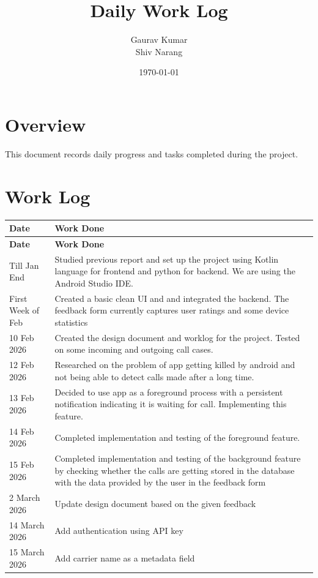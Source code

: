 \documentclass[11pt,a4paper]{article}
\title{\textbf{Daily Work Log}}
\author{Gaurav Kumar \\
Shiv Narang}
\date{\today}
\begin{document}
\maketitle

\section*{Overview}
This document records daily progress and tasks completed during the project.

\vspace{0.5cm}

\section*{Work Log}

\begin{longtable}{|p{3cm}|p{12cm}|}
\hline
\textbf{Date} & \textbf{Work Done} \\
\hline
\endfirsthead

\hline
\textbf{Date} & \textbf{Work Done} \\
\hline
\endhead


Till Jan End &
Studied previous report and set up the project using Kotlin language for frontend and python for backend. We are using the Android Studio IDE. \\
\hline

First Week of Feb &
Created a basic clean UI and and integrated the backend. The feedback form currently captures user ratings and some device statistics \\
\hline

10 Feb 2026 &
Created the design document and worklog for the project. Tested on some incoming and outgoing call cases.  \\
\hline

12 Feb 2026 &
Researched on the problem of app getting killed by android and not being able to detect calls made after a long time. \\
\hline

13 Feb 2026 &
Decided to use app as a foreground process with a persistent notification indicating it is waiting for call. Implementing this feature. \\
\hline

14 Feb 2026 &
Completed implementation and testing of the foreground feature.\\
\hline

15 Feb 2026 &
Completed implementation and testing of the background feature by checking whether the calls are getting stored in the database with the data provided by the user in the feedback form\\
\hline

2 March 2026 &
Update design document based on the given feedback \\
\hline
14 March 2026 &
Add authentication using API key \\
\hline
15 March 2026 &
Add carrier name as a metadata field \\
\hline


\end{longtable}
\end{document}
